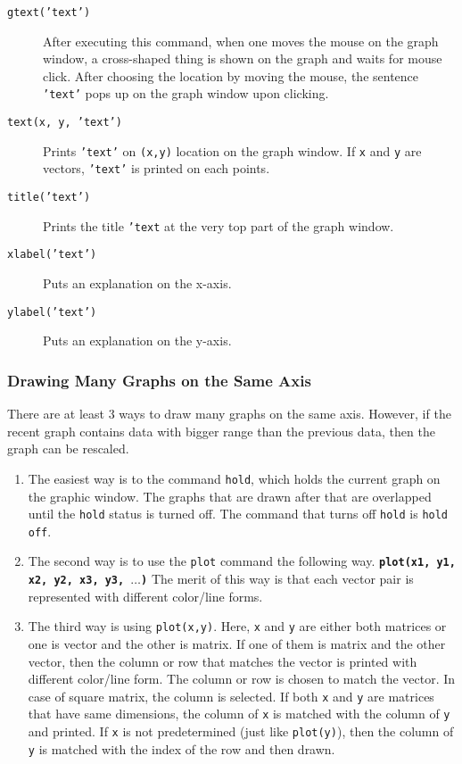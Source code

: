 \begin{description}
\item[\tt gtext('text')] \hfil \par
After executing this command, when one moves the mouse on the graph window, a cross-shaped thing is shown on the graph and waits for mouse click. After choosing the location by moving the mouse, the sentence {\tt 'text'} pops up on the graph window upon clicking. 

\item[\tt text(x, y, 'text')] \hfil \par
Prints {\tt 'text'} on {\tt (x,y)} location on the graph window. If {\tt x} and {\tt y} are vectors, {\tt 'text'} is printed on each points.

\item[\tt title('text')] \hfil \par
Prints the title {\tt 'text} at the very top part of the graph window.

\item[\tt xlabel('text')] \hfil \par
Puts an explanation on the x-axis.

\item[\tt ylabel('text')] \hfil \par
Puts an explanation on the y-axis.
\end{description}

\subsubsection{Drawing Many Graphs on the Same Axis}
There are at least 3 ways to draw many graphs on the same axis. However, if the recent graph contains data with bigger range than the previous data, then the graph can be rescaled.
\begin{enumerate}
\item The easiest way is to the command {\tt hold}, which holds the current graph on the graphic window. The graphs that are drawn after that are overlapped until the {\tt hold} status is turned off. The command that turns off {\tt hold} is {\tt hold off}.

\item The second way is to use the {\tt plot} command the following way. \vv \texttt{\textbf{plot(x1, y1, x2, y2, x3, y3, $\ldots$)}} \vn The merit of this way is that each vector pair is represented with different color/line forms. 

\item The third way is using {\tt plot(x,y)}. Here, {\tt x} and {\tt y} are either both matrices or one is vector and the other is matrix. If one of them is matrix and the other vector, then the column or row that matches the vector is printed with different color/line form. The column or row is chosen to match the vector. In case of square matrix, the column is selected. If both {\tt x} and {\tt y} are matrices that have same dimensions, the column of {\tt x} is matched with the column of {\tt y} and printed. If {\tt x} is not predetermined (just like {\tt plot(y)}), then the column of {\tt y} is matched with the index of the row and then drawn.

\end{enumerate}

